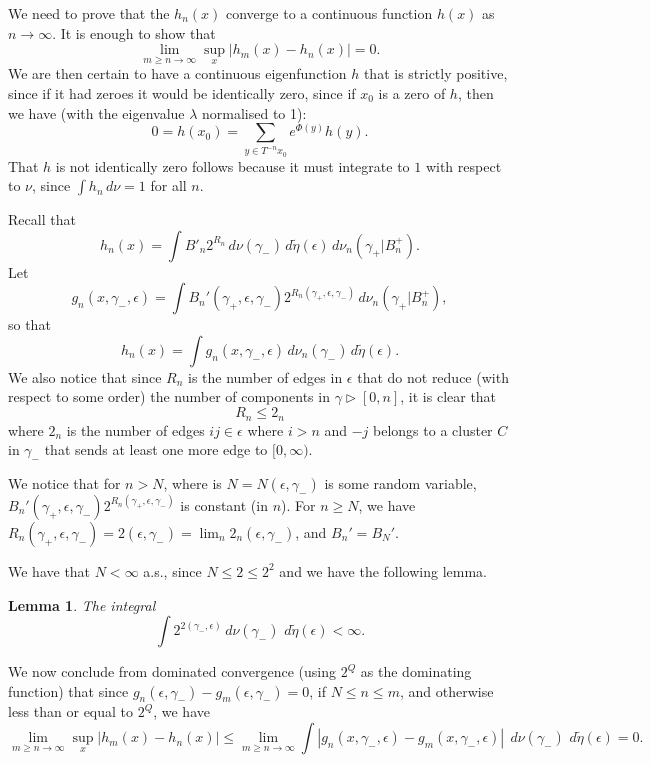 \documentclass[11pt, a4paper]{amsart}
\newtheorem{lemma}[thm]{Lemma}
\theoremstyle{definition}
\theoremstyle{remark}
\renewcommand{\d}{\,d}
\providecommand{\e}{\epsilon}
\providecommand{\tl}{\tilde}
\providecommand{\g}{\gamma}
\begin{document}
We need to prove that the $h_n(x)$ converge to a continuous function $h(x)$ as
$n\to\infty$. It is enough to show that
$$ \lim_{m\geq n\to \infty}\sup_{x} |h_m(x)-h_n(x)|=0.$$
We are then certain to have a continuous eigenfunction $h$ that is strictly positive, since if it had zeroes it would be identically zero, since if $x_0$ is a zero of $h$, then we have (with the eigenvalue $\lambda $ normalised to 1):
$$0= h(x_0)=\sum_{y\in T^{-n}x_0} e^{\Phi(y)} h(y).$$
That $h$ is not identically zero follows because it must integrate to $1$ with respect to $\nu$, since $\int h_n \d\nu=1$ for all $n$.

Recall that
\begin{equation}\label{eq:3}
  h_n(x) =  \int B'_n 2^{R_n} \d \nu(\g_-)\d\tl\eta(\e) \d \nu_n(\g_+|B_n^+).
\end{equation}
Let 
$$g_n(x,\gamma_-,\epsilon)=\int B_n' (\gamma_+,\epsilon, \gamma_-) 2^{R_n(\gamma_+,\epsilon,\gamma_-)} \,d\nu_n(\g_+|B_n^+),$$
so that 
$$h_n(x)= \int g_n(x,\gamma_-,\epsilon) \d \nu_n(\g_-)\d\tl\eta(\e).$$
We also notice that since $R_n$ is the number of edges in $\e$ that do not reduce (with respect to
some order) the number of components in $\g\triangleright [0,n]$, it is clear
that
\begin{equation}\label{eq:RleQ}
  R_n \le 2_{n}
\end{equation}
where \(2_{n}\) is the number of edges $ij\in\e$ where $i>n$ and $-j$ belongs
to a cluster $C$ in $\g_-$ that sends at least one more edge to $[0,\infty)$.

We notice that  for $n>N$, where is $N=N(\epsilon, \gamma_-)$ is some random variable, $ B_n' (\gamma_+,\epsilon, \gamma_-) 2^{R_n(\gamma_+,\epsilon,\gamma_-)} $ is constant (in $n$). For $n\geq N$, we have $R_n(\gamma_+,\epsilon,\gamma_-)=2(\epsilon, \gamma_-)=\lim_n 2_n(\epsilon, \gamma_-)$, and $B_n'=B_N'$.

We have that $N<\infty$ a.s., since $N\leq 2\leq 2^2$ and we have the following lemma.
\begin{lemma}\label{lem:qn}
  The integral
  $$
    \int 2^{2(\gamma_-,\epsilon)} \d\nu(\g_-)\, \d\tilde\eta(\e) <\infty.
  $$
\end{lemma}
We now conclude from dominated convergence (using $2^Q$ as the dominating function) that since $g_n(\epsilon, \gamma_-)-g_m(\epsilon, \gamma_-)=0$, if $N\leq n\leq m$, and otherwise less than or equal to $2^Q$, we have 
$$ \lim_{m\geq n\to \infty}\sup_{x} |h_m(x)-h_n(x)|\leq \lim_{m\geq n\to \infty} \int |g_n(x,\gamma_-,\epsilon)-g_m(x,\gamma_-,\epsilon)   |\; \d\nu(\g_-)\, \d\tilde\eta(\e)=0.$$
\end{document}
